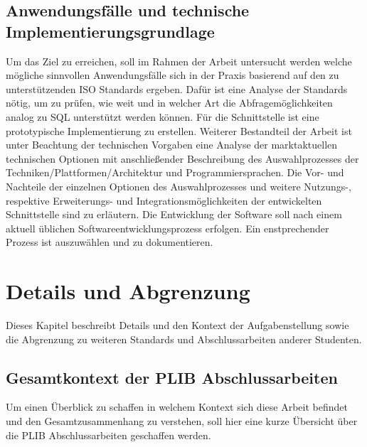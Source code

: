 \subsection{Anwendungsfälle und technische Implementierungsgrundlage}

Um das Ziel zu erreichen, soll im Rahmen der Arbeit untersucht werden welche mögliche sinnvollen Anwendungsfälle sich in der Praxis basierend auf den zu unterstützenden ISO Standards ergeben. Dafür ist eine Analyse der Standards nötig, um zu prüfen, wie weit und in welcher Art die Abfragemöglichkeiten analog zu SQL unterstützt werden können. Für die Schnittstelle ist eine prototypische Implementierung zu erstellen. Weiterer Bestandteil der Arbeit ist unter Beachtung der technischen Vorgaben eine Analyse der marktaktuellen technischen Optionen mit anschließender Beschreibung des Auswahlprozesses der Techniken/Plattformen/Architektur und Programmiersprachen. Die Vor- und Nachteile der einzelnen Optionen des Auswahlprozesses und weitere Nutzungs-, respektive Erweiterungs- und Integrationsmöglichkeiten der entwickelten Schnittstelle sind zu erläutern. 
Die Entwicklung der Software soll nach einem aktuell üblichen Softwareentwicklungsprozess erfolgen. Ein enstprechender Prozess ist auszuwählen und zu dokumentieren. 

\section{Details und Abgrenzung}

Dieses Kapitel beschreibt Details und den Kontext der Aufgabenstellung sowie die Abgrenzung zu weiteren Standards und Abschlussarbeiten anderer Studenten. 

\subsection{Gesamtkontext der PLIB Abschlussarbeiten}

Um einen Überblick zu schaffen in welchem Kontext sich diese Arbeit befindet und den Gesamtzusammenhang zu verstehen, soll hier eine kurze Übersicht über die PLIB Abschlussarbeiten geschaffen werden. 

